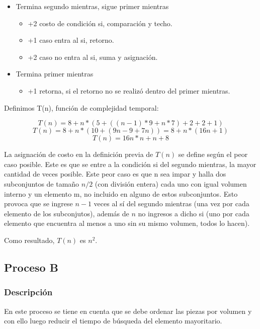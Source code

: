 \documentclass{article}
\begin{document}
\begin{itemize}
    \item Termina segundo mientras, sigue primer mientras
    \begin{itemize}
        \item +2 costo de condición si, comparación y techo.
        \item +1 caso entra al si, retorno.
        \item +2 caso no entra al si, suma y asignación.        
    \end{itemize}
    \item Termina primer mientras
    \begin{itemize}
        \item +1 retorna, si el retorno no se realizó dentro del primer mientras.
    \end{itemize}

\end{itemize}

Definimos T(n), función de complejidad temporal:

\begin{equation}
    T(n) = 8 + n* ( 5 + ( (n-1)*9 + n*7 ) + 2 + 2 + 1 ) 
\end{equation}
\begin{equation}
    T(n) = 8 + n*( 10 + (9n - 9 + 7n) ) = 8 + n*( 16n + 1)
\end{equation}
\begin{equation}
    T(n) = 16n*n + n + 8
\end{equation}

La asignación de costo en la definición previa de \(T(n)\) se define según el peor caso posible. 
Este es que se entre a la condición si del segundo mientras, la mayor cantidad de veces posible. 
Este peor caso es que n sea impar y halla dos subconjuntos de tamaño \(n/2\) (con división entera) cada uno con igual volumen interno y un elemento m, 
no incluido en alguno de estos subconjuntos. 
Esto provoca que se ingrese \(n-1\) veces al sí del segundo mientras (una vez por cada elemento de los subconjutos), 
además de \(n\) no ingresos a dicho si (uno por cada elemento que encuentra al menos a uno sin su mismo volumen, todos lo hacen).

Como resultado, \(T(n)\) es \(n^2\).

\newpage
\subsection{Proceso B}
\subsubsection{Descripción}
En este proceso se tiene en cuenta que se debe ordenar las piezas por volumen y con ello luego reducir el tiempo de búsqueda del elemento mayoritario.
\end{document}
